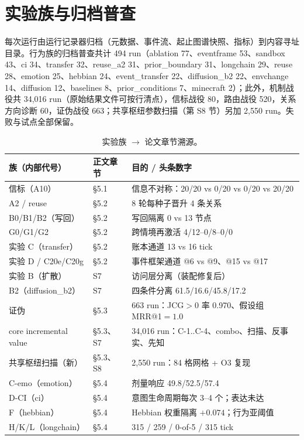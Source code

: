 \documentclass[10pt,a4paper]{ctexart}
\begin{document}
\section{实验族与归档普查}
\label{s3:families}

每次运行由运行记录器归档（元数据、事件流、起止图谱快照、指标）到内容寻址目录。行为族的归档普查共计 494 run（ablation 77、eventframe 53、sandbox 43、ci 34、transfer 32、reuse\_a2 31、prior\_boundary 31、longchain 29、reuse 28、emotion 25、hebbian 24、event\_transfer 22、diffusion\_b2 22、envchange 14、diffusion 12、baselines 8、prior\_conditions 7、minecraft 2）；此外，机制战役共 34,016 run（原始结果文件可按行清点），信标战役 80，路由战役 520，关系方向诊断 60，证伪战役 663；共享枢纽参数扫描（第 S8 节）另加 2,550 run。失败与试点全部保留。

\begin{table}[h]
\centering\small
\caption{实验族 $\rightarrow$ 论文章节溯源。}
\label{tab:s-family}
\begin{tabular}{L{4.6cm}L{3.6cm}L{6.6cm}}
\toprule
\textbf{族（内部代号）} & \textbf{正文章节} & \textbf{目的 / 头条数字} \\
\midrule
信标（A10） & \S5.1 & 信息不对称：20/20 vs 0/20 vs 0/20 vs 20/20 \\
A2 / reuse & \S5.2 & 8 轮每种子晋升 4 条关系 \\
B0/B1/B2（写回） & \S5.2 & 写回隔离 0 vs 13 节点 \\
G0/G1/G2 & \S5.2 & 跨情境再激活 4/12--0/8--0/0 \\
实验 C（transfer） & \S5.2 & 账本通道 13 vs 16 tick \\
实验 D / C20e/C20g & \S5.2 & 事件框架通道 @6 vs @9、@15 vs @17 \\
实验 B（扩散） & S7 & 访问层分离（装配修复后） \\
B2（diffusion\_b2） & S7 & 四条件分离 61.5/16.6/45.8/17.2 \\
证伪 & \S5.3 & 663 run：JCG$>0$ 率 0.970、假设组 MRR@1$=1.0$ \\
core incremental value & \S5.3、S7 & 34,016 run：C-1..C-4、combo、扫描、反事实、先知 \\
共享枢纽扫描（新） & \S5.3、S8 & 2,550 run：84 格网格 + O3 复现 \\
C-emo（emotion） & \S5.4 & 剂量响应 49.8/52.5/57.4 \\
D-CI（ci） & \S5.4 & 意图生命周期每次 3--4 个；表达未达 \\
F（hebbian） & \S5.4 & Hebbian 权重隔离 $+0.074$；行为亚阈值 \\
H/K/L（longchain） & \S5.4 & 315 / 259 / 0-of-5 / 315 tick \\

\end{tabular}
\end{table}
\end{document}
